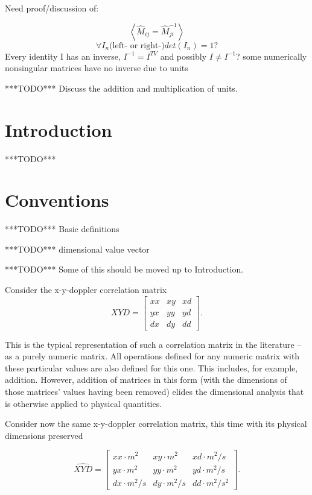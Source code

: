 \documentclass[10pt,letterpaper]{article}
\author{T. Zachary Laine}
\numberwithin{equation}{section}
\begin{document}
Need proof/discussion of:

\[ \left\langle \hat{M}_{ij} = \hat{M}^{-1}_{ji}\right\rangle \]
\[ \forall I_{n} \mbox{(left- or right-)} det(I_{n}) = 1 ? \]
Every identity I has an inverse, $I^{-1} = I^{TV}$ and possibly $I \not= I^{-1}$?
some numerically nonsingular matrices have no inverse due to units

***TODO*** Discuss the addition and multiplication of units.

\section{Introduction}

***TODO***

\section{Conventions}

***TODO*** Basic definitions

***TODO*** dimensional value vector

***TODO*** Some of this should be moved up to Introduction.

Consider the x-y-doppler correlation matrix
\[XYD = \left[ \begin{matrix}
xx & xy & xd \\ yx & yy & yd \\ dx & dy & dd
\end{matrix} \right]. \]

This is the typical representation of such a correlation matrix in the literature – as a purely numeric matrix.  All operations defined for any numeric matrix with these particular values are also defined for this one.  This includes, for example, addition.  However, addition of matrices in this form (with the dimensions of those matrices' values having been removed) elides the dimensional analysis that is otherwise applied to physical quantities.

Consider now the same x-y-doppler correlation matrix, this time with its physical dimensions preserved

\[ \widehat{XYD}= \left[ \begin{matrix}
  xx \cdot m^2 & xy \cdot m^2 & xd \cdot m^2/s \\
  yx \cdot m^2 & yy \cdot m^2 & yd \cdot m^2/s \\
  dx \cdot m^2/s & dy \cdot m^2/s & dd \cdot m^2/s^2
\end{matrix} \right]. \]
\end{document}
